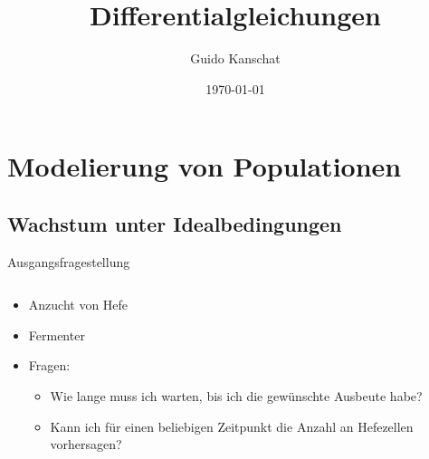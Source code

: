 \documentclass[notheorems,hidelinks,aspectratio=1610]{beamer}
\title{Differentialgleichungen}
\author{Guido Kanschat}
\date{\today}
\begin{document}
\frame{\maketitle}

\section{Modelierung von Populationen}
\frame{\sectoc}
\subsection{Wachstum unter Idealbedingungen}
\frame{\subtoc}
\begin{frame}{Ausgangsfragestellung}
  \begin{columns}
    \begin{column}{.6\textwidth}
      \begin{itemize}
      \item<+-> Anzucht von Hefe
      \item<+-> Fermenter
      \item<+-> Fragen:
        \begin{itemize}
        \item<+-> Wie lange muss ich warten, bis ich die gewünschte Ausbeute habe?
        \item<+-> Kann ich für einen beliebigen Zeitpunkt die Anzahl
          an Hefezellen vorhersagen?
        \end{itemize}
      \end{itemize}
    \end{column}
    \begin{column}{.39\textwidth}
      \begin{center}
\end{center}
\end{column}
\end{columns}
\end{frame}
\end{document}

